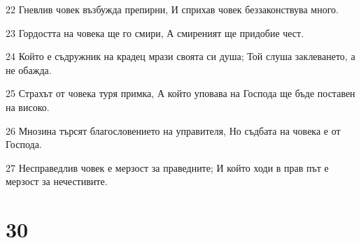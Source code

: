 \par 22 Гневлив човек възбужда препирни, И сприхав човек беззаконствува много.
\par 23 Гордостта на човека ще го смири, А смиреният ще придобие чест.
\par 24 Който е съдружник на крадец мрази своята си душа; Той слуша заклеването, а не обажда.
\par 25 Страхът от човека туря примка, А който уповава на Господа ще бъде поставен на високо.
\par 26 Мнозина търсят благословението на управителя, Но съдбата на човека е от Господа.
\par 27 Несправедлив човек е мерзост за праведните; И който ходи в прав път е мерзост за нечестивите.

\chapter{30}

